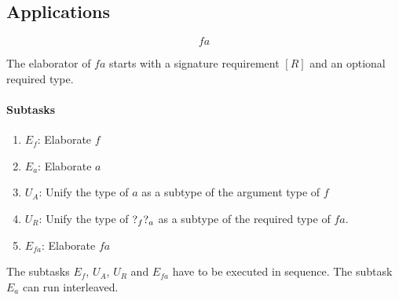 \subsection{Applications}

$$ f a$$


The elaborator of $f a$ starts with a signature requirement $[R]$ and
an optional required type.

\paragraph{Subtasks}
\begin{enumerate}
    \item $E_f$: Elaborate $f$
    \item $E_a$: Elaborate $a$
    \item $U_{A}$: Unify the type of $a$ as a subtype of the argument type of
        $f$
    \item $U_{R}$: Unify the type of ${?_{f}} {?_{a}}$ as a subtype of the
        required type of $fa$.
    \item $E_{fa}$: Elaborate $fa$
\end{enumerate}

The subtasks $E_f$, $U_A$, $U_R$ and $E_{fa}$ have to be executed in sequence. The
subtask $E_a$ can run interleaved.


